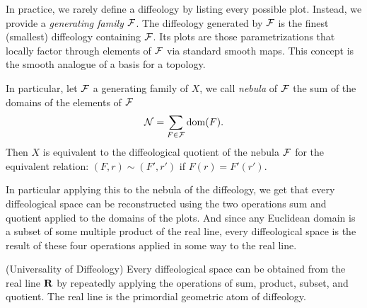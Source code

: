\documentclass[10pt,reqno,letterpaper,twoside]{amsbook}
\begin{document}
  \begin{article}
    In practice,
    we rarely define a diffeology by listing every possible plot.
    Instead,
    we provide a \emph{generating family} $\mathcal{F}$.
    The diffeology generated by $\mathcal{F}$ is the finest (smallest) diffeology containing $\mathcal{F}$.
    Its plots are those parametrizations that locally factor through elements of $\mathcal{F}$ via standard smooth maps.
    This concept is the smooth analogue of a basis for a topology.
    
    In particular,
    let $\mathcal{F}$ a generating family of $X$,
    we call \emph{nebula} of $\mathcal{F}$ the sum of the domains of the elements of $\mathcal{F}$
    $$
      \mathcal{N} = \sum_{F \in \mathcal{F}} \operatorname{dom}(F).
      $$%
    Then $X$ is equivalent to the diffeological quotient of the nebula $\mathcal{F}$ for the equivalent relation:
    $(F,r) \sim (F',r')$ if $F(r) = F'(r')$.
    
    In particular applying this to the nebula of the diffeology,
    we get that every diffeological space can be reconstructed using the two operations sum and quotient applied to the domains of the plots.
    And since any Euclidean domain is a subset of some multiple product of the real line,
    every diffeological space is the result of these four operations applied in some way to the real line.
    
    \begin{proposition}\textup{(Universality of Diffeology)}
      Every diffeological space can be obtained from the real line ${\mathbf{R}}$ by
      repeatedly applying the operations of sum, product, subset, and quotient.
      The real line is the primordial geometric atom of diffeology.
    \end{proposition}
  \end{article}
  
\end{document}
